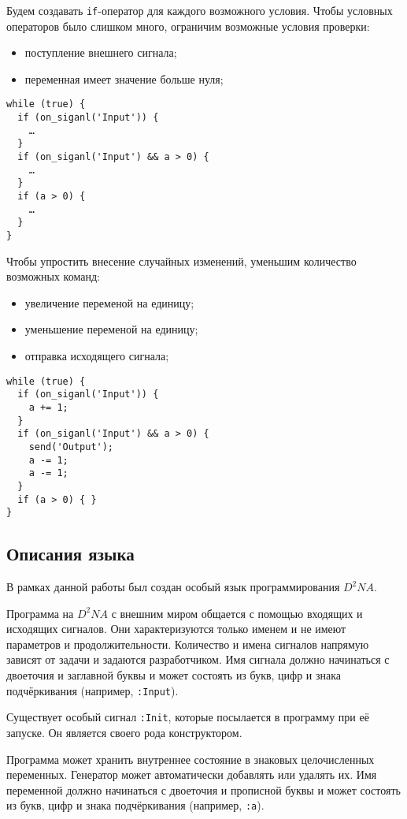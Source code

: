 \documentclass[utf8,a5paper,portrait,10pt,twoside]{eskdtext}
\begin{document}
Будем создавать \texttt{if}-оператор для каждого возможного условия. Чтобы
условных операторов было слишком много, ограничим возможные условия проверки:
\begin{itemize}
  \item поступление внешнего сигнала;
  \item переменная имеет значение больше нуля;
\end{itemize}

\newpage
\begin{verbatim}
while (true) {
  if (on_siganl('Input')) {
    …
  }
  if (on_siganl('Input') && a > 0) {
    …
  }
  if (a > 0) {
    …
  }
}
\end{verbatim}

Чтобы упростить внесение случайных изменений, уменьшим количество возможных
команд:
\begin{itemize}
  \item увеличение переменой на единицу;
  \item уменьшение переменой на единицу;
  \item отправка исходящего сигнала;
\end{itemize}

\begin{verbatim}
while (true) {
  if (on_siganl('Input')) {
    a += 1;
  }
  if (on_siganl('Input') && a > 0) {
    send('Output');
    a -= 1;
    a -= 1;
  }
  if (a > 0) { }
}
\end{verbatim}

\subsection{Описания языка}

В рамках данной работы был создан особый язык программирования $D^2NA$.

Программа на $D^2NA$ с внешним миром общается с помощью входящих и исходящих
сигналов. Они характеризуются только именем и не имеют параметров и
продолжительности. Количество и имена сигналов напрямую зависят от задачи и
задаются разработчиком. Имя сигнала должно начинаться с двоеточия и заглавной
буквы и может состоять из букв, цифр и знака подчёркивания (например,
\texttt{:Input}).

Существует особый сигнал \texttt{:Init}, которые посылается в программу при её
запуске. Он является своего рода конструктором.

Программа может хранить внутреннее состояние в знаковых целочисленных
переменных. Генератор может автоматически добавлять или удалять их. Имя
переменной должно начинаться с двоеточия и прописной буквы и может состоять из
букв, цифр и знака подчёркивания (например, \texttt{:a}).
\end{document}
